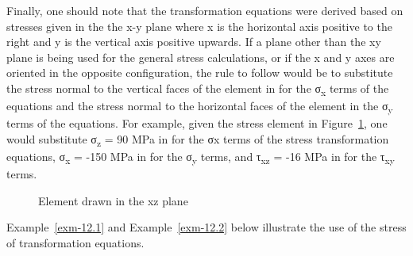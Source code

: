 \documentclass[
  letterpaper,
  DIV=11,
  numbers=noendperiod]{scrreprt}
\theoremstyle{definition}
\theoremstyle{remark}
\begin{document}
Finally, one should note that the transformation equations were derived
based on stresses given in the the x-y plane where x is the horizontal
axis positive to the right and y is the vertical axis positive upwards.
If a plane other than the xy plane is being used for the general stress
calculations, or if the x and y axes are oriented in the opposite
configuration, the rule to follow would be to substitute the stress
normal to the vertical faces of the element in for the
σ\textsubscript{x} terms of the equations and the stress normal to the
horizontal faces of the element in the σ\textsubscript{y} terms of the
equations. For example, given the stress element in
Figure~\ref{fig-12.6}, one would substitute σ\textsubscript{z} = 90 MPa
in for the σx terms of the stress transformation equations,
σ\textsubscript{x} = -150 MPa in for the σ\textsubscript{y} terms, and
τ\textsubscript{xz} = -16 MPa in for the τ\textsubscript{xy} terms.

\begin{figure}


\caption{\label{fig-12.6}Element drawn in the xz plane}

\end{figure}%

Example~\ref{exm-12.1} and Example~\ref{exm-12.2} below illustrate the
use of the stress of transformation equations.
\end{document}
